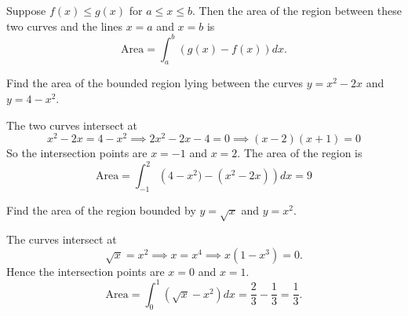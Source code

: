 \documentclass[../main.tex]{subfiles}
\begin{document}
Suppose $f(x) \le g(x)$ for $a \le x \le b$. Then the area of the region between these two curves and the lines $x=a$ and $x=b$ is
\[
	\text{Area} = \int_a^b (g(x) - f(x)) dx.
\]
\begin{example}
	Find the area of the bounded region lying between the curves $y=x^2 - 2x$ and $y= 4-x^2$.
\end{example}

\begin{minipage}{0.5\textwidth}
	\begin{solution}
		The two curves intersect at
		\[
			x^2-2x = 4-x^2 \implies 2x^2 - 2x - 4 = 0 \implies (x-2)(x+1) = 0
		\]
		So the intersection points are $x=-1$ and $x=2$.
		The area of the region is
		\[
			\text{Area} = \int_{-1}^2 \left(4-x^2) - (x^2 - 2x)  \right) dx = 9
		\]

	\end{solution}  
\end{minipage}%
\begin{minipage}{0.5\textwidth}
  \begin{figure}[H]
	\centering
	
\end{figure}
\end{minipage}

\begin{example}
	Find the area of the region bounded by $y=\sqrt{x}$ and $y=x^2$.
\end{example}
\begin{minipage}{0.5\textwidth}
  \begin{solution}
  	The curves intersect at
  	\[
  		\sqrt{x} = x^2 \implies x = x^4 \implies x(1-x^3) = 0.
  	\]
  	Hence the intersection points are $x=0$ and $x=1$.
  	\[
  		\text{Area} = \int_0^1 \left( \sqrt{x} - x^2 \right) dx = \frac{2}{3} - \frac{1}{3} = \frac{1}{3}.
  	\]
  \end{solution}
\end{minipage}%
\begin{minipage}{0.5\textwidth}
  \begin{figure}[H]
    	\centering
    	
   \end{figure}
\end{minipage}
\end{document}

